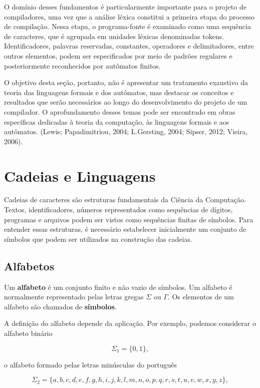 \documentclass[
  brazilian,
  letterpaper,
]{book}
\theoremstyle{plain}
\theoremstyle{definition}
\theoremstyle{remark}
\begin{document}
O domínio desses fundamentos é particularmente importante para o projeto
de compiladores, uma vez que a análise léxica constitui a primeira etapa
do processo de compilação. Nessa etapa, o programa-fonte é examinado
como uma sequência de caracteres, que é agrupada em unidades léxicas
denominadas tokens. Identificadores, palavras reservadas, constantes,
operadores e delimitadores, entre outros elementos, podem ser
especificados por meio de padrões regulares e posteriormente
reconhecidos por autômatos finitos.

O objetivo desta seção, portanto, não é apresentar um tratamento
exaustivo da teoria das linguagens formais e dos autômatos, mas destacar
os conceitos e resultados que serão necessários ao longo do
desenvolvimento do projeto de um compilador. O aprofundamento desses
temas pode ser encontrado em obras específicas dedicadas à teoria da
computação, às linguagens formais e aos autômatos. (Lewis;
Papadimitriou, 2004; L.Gersting, 2004; Sipser, 2012; Vieira, 2006).

\section{Cadeias e Linguagens}\label{cadeias-e-linguagens}

Cadeias de caracteres são estruturas fundamentais da Ciência da
Computação. Textos, identificadores, números representados como
sequências de dígitos, programas e arquivos podem ser vistos como
sequências finitas de símbolos. Para entender essas estruturas, é
necessário estabelecer inicialmente um conjunto de símbolos que podem
ser utilizados na construção das cadeias.

\subsection{Alfabetos}\label{alfabetos}

Um \textbf{alfabeto} é um conjunto finito e não vazio de símbolos. Um
alfabeto é normalmente representado pelas letras gregas \(\Sigma\) ou
\(\Gamma\). Os elementos de um alfabeto são chamados de
\textbf{símbolos}.

A definição do alfabeto depende da aplicação. Por exemplo, podemos
considerar o alfabeto binário

\[
\Sigma_1=\{0,1\},
\]

o alfabeto formado pelas letras minúsculas do português

\[
\Sigma_2=
\{a,b,c,d,e,f,g,h,i,j,k,l,m,n,o,p,q,r,s,t,u,v,w,x,y,z\},
\]
\end{document}

